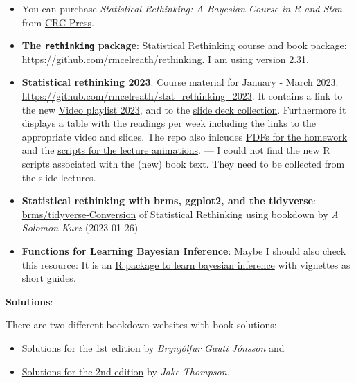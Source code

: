 \documentclass[
  letterpaper,
  DIV=11,
  numbers=noendperiod]{scrreprt}
\providecommand{\tightlist}{%
  \setlength{\itemsep}{0pt}\setlength{\parskip}{0pt}}\usepackage{longtable,booktabs,array}
\begin{document}

\begin{itemize}
\tightlist
\item
  You can purchase \emph{Statistical Rethinking: A Bayesian Course in R
  and Stan} from
  \href{https://www.routledge.com/Statistical-Rethinking-A-Bayesian-Course-with-Examples-in-R-and-STAN/McElreath/p/book/9780367139919?utm_source=crcpress.com&utm_medium=referral}{CRC
  Press}.
\item
  \textbf{The \texttt{rethinking} package}: Statistical Rethinking
  course and book package:
  \url{https://github.com/rmcelreath/rethinking}. I am using version
  2.31.
\item
  \textbf{Statistical rethinking 2023}: Course material for January -
  March 2023. \url{https://github.com/rmcelreath/stat_rethinking_2023}.
  It contains a link to the new
  \href{https://www.youtube.com/watch?v=FdnMWdICdRs&list=PLDcUM9US4XdPz-KxHM4XHt7uUVGWWVSus}{Video
  playlist 2023}, and to the
  \href{https://speakerdeck.com/rmcelreath/}{slide deck collection}.
  Furthermore it displays a table with the readings per week including
  the links to the appropriate video and slides. The repo also inlcudes
  \href{https://github.com/petzi53/stat_rethinking_2023/tree/main/homework}{PDFs
  for the homework} and the
  \href{https://github.com/petzi53/stat_rethinking_2023/tree/main/homework}{scripts
  for the lecture animations}. --- I could not find the new R scripts
  associated with the (new) book text. They need to be collected from
  the slide lectures.
\item
  \textbf{Statistical rethinking with brms, ggplot2, and the tidyverse}:
  \href{https://bookdown.org/content/4857/}{brms/tidyverse-Conversion}
  of Statistical Rethinking using bookdown by \emph{A Solomon Kurz}
  (2023-01-26)
\item
  \textbf{Functions for Learning Bayesian Inference}: Maybe I should
  also check this resource: It is an
  \href{https://cran.r-project.org/package=LearnBayes}{R package to
  learn bayesian inference} with vignettes as short guides.
\end{itemize}

\textbf{Solutions}:

There are two different bookdown websites with book solutions:

\begin{itemize}
\tightlist
\item
  \href{https://bookdown.org/bgautijonsson/statistical_rethinking_solutions/}{Solutions
  for the 1st edition} by \emph{Brynjólfur Gauti Jónsson} and
\item
  \href{https://github.com/wjakethompson/sr2-solutions}{Solutions for
  the 2nd edition} by \emph{Jake Thompson.}
\end{itemize}
\end{document}
